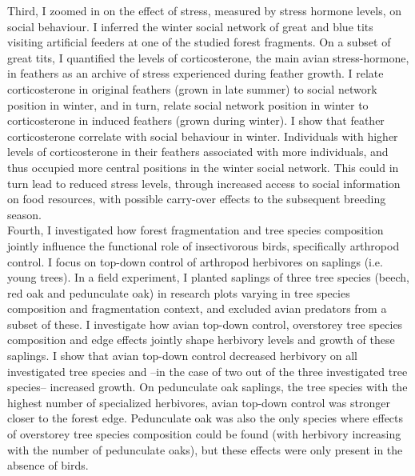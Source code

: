 \documentclass[10pt, twoside]{book} %
\begin{document}
Third, I zoomed in on the effect of stress, measured by stress hormone levels, on social behaviour. I inferred the winter social network of great and blue tits visiting artificial feeders at one of the studied forest fragments. On a subset of great tits, I quantified the levels of corticosterone, the main avian stress-hormone, in feathers as an archive of stress experienced during feather growth. I relate corticosterone in original feathers (grown in late summer) to social network position in winter, and in turn, relate social network position in winter to corticosterone in induced feathers (grown during winter). I show that feather corticosterone correlate with social behaviour in winter. Individuals with higher levels of corticosterone in their feathers associated with more individuals, and thus occupied more central positions in the winter social network. This could in turn lead to reduced stress levels, through increased access to social information on food resources, with possible carry-over effects to the subsequent breeding season.\\

Fourth, I investigated how forest fragmentation and tree species composition jointly influence the functional role of insectivorous birds, specifically arthropod control. I focus on top-down control of arthropod herbivores on saplings (i.e. young trees). In a field experiment, I planted saplings of three tree species (beech, red oak and pedunculate oak) in research plots varying in tree species composition and fragmentation context, and excluded avian predators from a subset of these. I investigate how avian top-down control, overstorey tree species composition and edge effects jointly shape herbivory levels and growth of these saplings. I show that avian top-down control decreased herbivory on all investigated tree species and --in the case of two out of the three investigated tree species-- increased growth. On pedunculate oak saplings, the tree species with the highest number of specialized herbivores, avian top-down control was stronger closer to the forest edge. Pedunculate oak was also the only species where effects of overstorey tree species composition could be found (with herbivory increasing with the number of pedunculate oaks), but these effects were only present in the absence of birds.\\
\end{document}
